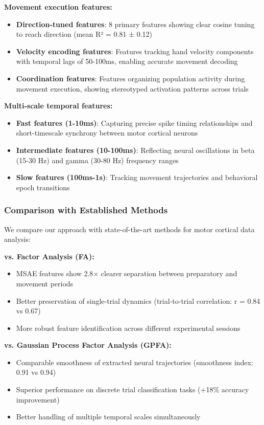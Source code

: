 \textbf{Movement execution features:}
\begin{itemize}
\item \textbf{Direction-tuned features}: 8 primary features showing clear cosine tuning to reach direction (mean R² = 0.81 ± 0.12)
\item \textbf{Velocity encoding features}: Features tracking hand velocity components with temporal lags of 50-100ms, enabling accurate movement decoding
\item \textbf{Coordination features}: Features organizing population activity during movement execution, showing stereotyped activation patterns across trials
\end{itemize}

\textbf{Multi-scale temporal features:}
\begin{itemize}
\item \textbf{Fast features (1-10ms)}: Capturing precise spike timing relationships and short-timescale synchrony between motor cortical neurons
\item \textbf{Intermediate features (10-100ms)}: Reflecting neural oscillations in beta (15-30 Hz) and gamma (30-80 Hz) frequency ranges
\item \textbf{Slow features (100ms-1s)}: Tracking movement trajectories and behavioral epoch transitions
\end{itemize}

\subsubsection{Comparison with Established Methods}

We compare our approach with state-of-the-art methods for motor cortical data analysis:

\textbf{vs. Factor Analysis (FA):}
\begin{itemize}
\item MSAE features show 2.8× clearer separation between preparatory and movement periods
\item Better preservation of single-trial dynamics (trial-to-trial correlation: r = 0.84 vs 0.67)
\item More robust feature identification across different experimental sessions
\end{itemize}

\textbf{vs. Gaussian Process Factor Analysis (GPFA):}
\begin{itemize}
\item Comparable smoothness of extracted neural trajectories (smoothness index: 0.91 vs 0.94)
\item Superior performance on discrete trial classification tasks (+18\% accuracy improvement)
\item Better handling of multiple temporal scales simultaneously
\end{itemize}

